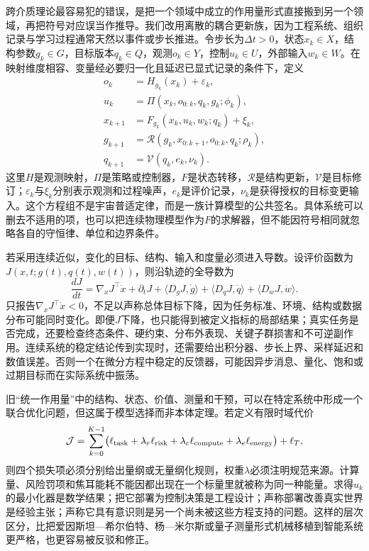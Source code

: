 跨介质理论最容易犯的错误，是把一个领域中成立的作用量形式直接搬到另一个领域，再把符号对应误当作推导。我们改用离散的耦合更新族，因为工程系统、组织记录与学习过程通常天然以事件或步长推进。令步长为$\Delta t>0$，状态$x_k\in X$，结构参数$g_k\in G$，目标版本$q_k\in Q$，观测$o_k\in Y$，控制$u_k\in U$，外部输入$w_k\in W$。在映射维度相容、变量经必要归一化且延迟已显式记录的条件下，定义
\begin{align}
o_k &= H_{g_k}(x_k)+\varepsilon_k,\\
u_k &= \Pi(x_k,o_{0:k},q_k,g_k;\phi_k),\\
x_{k+1} &= F_{g_k}(x_k,u_k,w_k;q_k)+\xi_k,\\
g_{k+1} &= \mathcal{R}(g_k,x_{0:k+1},o_{0:k},q_k;\rho_k),\\
q_{k+1} &= \mathcal{V}(q_k,e_k,\nu_k).
\end{align}
这里$H$是观测映射，$\Pi$是策略或控制器，$F$是状态转移，$\mathcal{R}$是结构更新，$\mathcal{V}$是目标修订；$\varepsilon_k$与$\xi_k$分别表示观测和过程噪声，$e_k$是评价记录，$\nu_k$是获得授权的目标变更输入。这个方程组不是宇宙普适定律，而是一族计算模型的公共签名。具体系统可以删去不适用的项，也可以把连续物理模型作为$F$的求解器，但不能因符号相同就忽略各自的守恒律、单位和边界条件。

若采用连续近似，变化的目标、结构、输入和度量必须进入导数。设评价函数为$J(x,t;g(t),q(t),w(t))$，则沿轨迹的全导数为
\[
\frac{dJ}{dt}=\nabla_xJ^\top\dot{x}+\partial_tJ+
\langle D_gJ,\dot g\rangle+\langle D_qJ,\dot q\rangle+
\langle D_wJ,\dot w\rangle.
\]
只报告$\nabla_xJ^\top\dot{x}<0$，不足以声称总体目标下降，因为任务标准、环境、结构或数据分布可能同时变化。即便$J$下降，也只能得到被定义指标的局部结果；真实任务是否完成，还要检查终态条件、硬约束、分布外表现、关键子群损害和不可逆副作用。连续系统的稳定结论传到实现时，还需要给出积分器、步长上界、采样延迟和数值误差。否则一个在微分方程中稳定的反馈器，可能因异步消息、量化、饱和或过期目标而在实际系统中振荡。

旧“统一作用量”中的结构、状态、价值、测量和干预，可以在特定系统中形成一个联合优化问题，但这属于模型选择而非本体定理。若定义有限时域代价
\[
\mathcal{J}=\sum_{k=0}^{K-1}\bigl(\ell_{\rm task}+\lambda_r\ell_{\rm risk}+\lambda_c\ell_{\rm compute}+\lambda_e\ell_{\rm energy}\bigr)+\ell_T,
\]
则四个损失项必须分别给出量纲或无量纲化规则，权重$\lambda$必须注明规范来源。计算量、风险罚项和焦耳能耗不能因都出现在一个标量里就被称为同一种能量。求得$u_k$的最小化器是数学结果；把它部署为控制决策是工程设计；声称部署改善真实世界是经验主张；声称它具有意识则是另一个尚未被这些方程支持的问题。这样的层次区分，比把爱因斯坦—希尔伯特、杨—米尔斯或量子测量形式机械移植到智能系统更严格，也更容易被反驳和修正。

